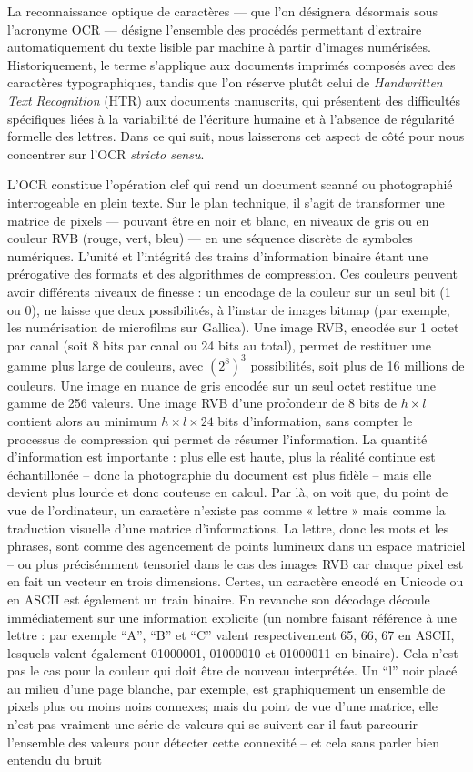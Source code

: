 La reconnaissance optique de caractères — que l’on désignera désormais sous l’acronyme OCR — désigne l’ensemble des procédés permettant d’extraire automatiquement du texte lisible par machine à partir d’images numérisées. Historiquement, le terme s’applique aux documents imprimés composés avec des caractères typographiques, tandis que l’on réserve plutôt celui de \emph{Handwritten Text Recognition} (HTR) aux documents manuscrits, qui présentent des difficultés spécifiques liées à la variabilité de l’écriture humaine et à l’absence de régularité formelle des lettres. Dans ce qui suit, nous laisserons cet aspect de côté pour nous concentrer sur l’OCR \emph{stricto sensu}.

L’OCR constitue l’opération clef qui rend un document scanné ou photographié interrogeable en plein texte. Sur le plan technique, il s’agit de transformer une matrice de pixels — pouvant être en noir et blanc, en niveaux de gris ou en couleur RVB (rouge, vert, bleu) — en une séquence discrète de symboles numériques. L'unité et l'intégrité des trains d'information binaire étant une prérogative des formats et des algorithmes de compression. Ces couleurs peuvent avoir différents niveaux de finesse : un encodage de la couleur sur un seul bit (1 ou 0), ne laisse que deux possibilités, à l'instar de images bitmap (par exemple, les numérisation de microfilms sur Gallica). Une image RVB, encodée sur 1 octet par canal (soit 8 bits par canal ou 24 bits au total), permet de restituer une gamme plus large de couleurs, avec $(2^8)^3$ possibilités, soit plus de 16 millions de couleurs. Une image en nuance de gris encodée sur un seul octet restitue une gamme de 256 valeurs. Une image RVB d'une profondeur de 8 bits de $h \times l$ contient alors au minimum $h \times l \times 24$ bits d'information, sans compter le processus de compression qui permet de résumer l'information. La quantité d'information est importante : plus elle est haute, plus la réalité continue est échantillonée -- donc la photographie du document est plus fidèle -- mais elle devient plus lourde et donc couteuse en calcul. Par là, on voit que, du point de vue de l’ordinateur, un caractère n’existe pas comme « lettre » mais comme la traduction visuelle d'une matrice d'informations. La lettre, donc les mots et les phrases, sont comme des agencement de points lumineux dans un espace matriciel -- ou plus précisémment tensoriel dans le cas des images RVB car chaque pixel est en fait un vecteur en trois dimensions. Certes, un caractère encodé en Unicode ou en ASCII est également un train binaire. En revanche son décodage découle immédiatement sur une information explicite (un nombre faisant référence à une lettre : par exemple \enquote{A}, \enquote{B} et \enquote{C} valent respectivement 65, 66, 67 en ASCII, lesquels valent également 01000001, 01000010 et 01000011 en binaire). Cela n'est pas le cas pour la couleur qui doit être de nouveau interprétée. Un \enquote{l} noir placé au milieu d'une page blanche, par exemple, est graphiquement un ensemble de pixels plus ou moins noirs connexes; mais du point de vue d'une matrice, elle n'est pas vraiment une série de valeurs qui se suivent car il faut parcourir l'ensemble des valeurs pour détecter cette connexité -- et cela sans parler bien entendu du bruit 